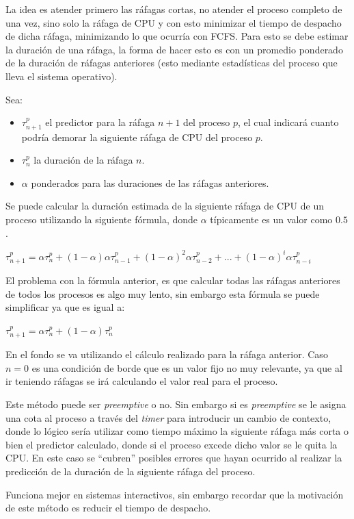 La idea es atender primero las ráfagas cortas, no atender el proceso completo de
una vez, sino solo la ráfaga de CPU y con esto minimizar el tiempo de despacho
de dicha ráfaga, minimizando lo que ocurría con FCFS. Para esto se debe estimar
la duración de una ráfaga, la forma de hacer esto es con un promedio ponderado
de la duración de ráfagas anteriores (esto mediante estadísticas del proceso que
lleva el sistema operativo).

Sea:
\begin{itemize}
\item $\tau^{p}_{n+1}$ el predictor para la ráfaga $n+1$ del proceso $p$, el
cual indicará cuanto podría demorar la siguiente ráfaga de CPU del proceso $p$.
\item $\tau^p_n$ la duración de la ráfaga $n$.
\item $\alpha$ ponderados para las duraciones de las ráfagas anteriores.
\end{itemize}

Se puede calcular la duración estimada de la siguiente ráfaga de CPU de un
proceso utilizando la siguiente fórmula, donde $\alpha$ típicamente es un valor
como $0.5$.

$\tau^p_{n+1} = \alpha \tau^p_n + (1-\alpha) \alpha \tau^p_{n-1} + (1-\alpha)^2 \alpha \tau^p_{n-2} + ... + (1-\alpha)^i \alpha \tau^p_{n-i} $

El problema con la fórmula anterior, es que calcular todas las ráfagas
anteriores de todos los procesos es algo muy lento, sin embargo esta fórmula se
puede simplificar ya que es igual a:

$\tau^p_{n+1} = \alpha \tau^p_n + (1-\alpha) \tau^p_n $

En el fondo se va utilizando el cálculo realizado para la ráfaga anterior.
Caso $n=0$ es una condición de borde que es un valor fijo no muy relevante, ya
que al ir teniendo ráfagas se irá calculando el valor real para el proceso.

Este método puede ser \textit{preemptive} o no. Sin embargo si es
\textit{preemptive} se le asigna una cota al proceso a través del \textit{timer}
para introducir un cambio de contexto, donde lo lógico sería utilizar como
tiempo máximo la siguiente ráfaga más corta o bien el predictor calculado, donde
si el proceso excede dicho valor se le quita la CPU. En este caso se ``cubren''
posibles errores que hayan ocurrido al realizar la predicción de la duración de
la siguiente ráfaga del proceso.

Funciona mejor en sistemas interactivos, sin embargo recordar que la motivación
de este método es reducir el tiempo de despacho.

